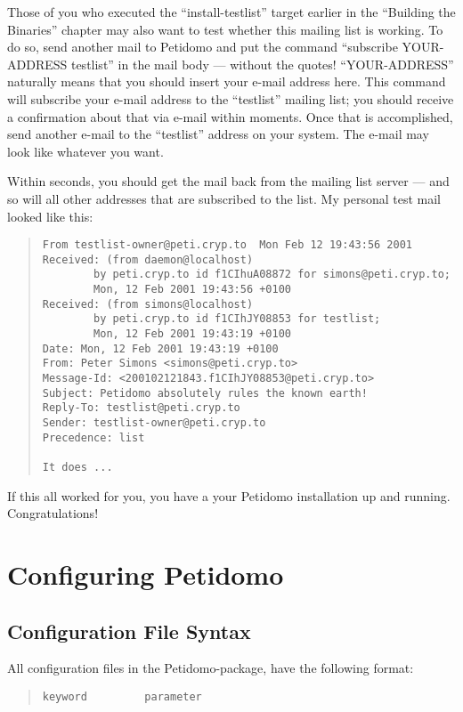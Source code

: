 \documentclass[a4paper,11pt]{scrreprt}
\begin{document}
Those of you who executed the ``install-testlist'' target earlier in
the ``Building the Binaries'' chapter may also want to test whether
this mailing list is working. To do so, send another mail to Petidomo
and put the command ``subscribe YOUR-ADDRESS testlist'' in the mail
body --- without the quotes! ``YOUR-ADDRESS'' naturally means that you
should insert your e-mail address here. This command will subscribe
your e-mail address to the ``testlist'' mailing list; you should
receive a confirmation about that via e-mail within moments. Once that
is accomplished, send another e-mail to the ``testlist'' address on
your system. The e-mail may look like whatever you want.

Within seconds, you should get the mail back from the mailing list
server --- and so will all other addresses that are subscribed to the
list. My personal test mail looked like this:

\begin{quote}
\begin{verbatim}
From testlist-owner@peti.cryp.to  Mon Feb 12 19:43:56 2001
Received: (from daemon@localhost)
        by peti.cryp.to id f1CIhuA08872 for simons@peti.cryp.to;
        Mon, 12 Feb 2001 19:43:56 +0100
Received: (from simons@localhost)
        by peti.cryp.to id f1CIhJY08853 for testlist;
        Mon, 12 Feb 2001 19:43:19 +0100
Date: Mon, 12 Feb 2001 19:43:19 +0100
From: Peter Simons <simons@peti.cryp.to>
Message-Id: <200102121843.f1CIhJY08853@peti.cryp.to>
Subject: Petidomo absolutely rules the known earth!
Reply-To: testlist@peti.cryp.to
Sender: testlist-owner@peti.cryp.to
Precedence: list

It does ...
\end{verbatim}
\end{quote}

If this all worked for you, you have a your Petidomo installation up
and running. Congratulations!

\chapter{Configuring Petidomo}

\section{Configuration File Syntax}

All configuration files in the Petidomo-package\label{Config file
format}, have the following format:
\begin{quote}
\begin{verbatim}
keyword         parameter
\end{verbatim}
\end{quote}
\end{document}
